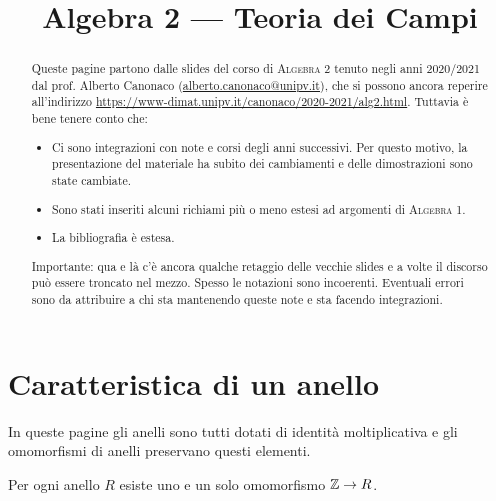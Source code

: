 


\title{Algebra 2 --- Teoria dei Campi}
\author{}
\date{}




\maketitle

\begin{abstract}
Queste pagine partono dalle \textenglish{slides} del corso di {\scshape Algebra 2} tenuto negli anni 2020/2021 dal prof. Alberto Canonaco (\url{alberto.canonaco@unipv.it}), che si possono ancora reperire all'indirizzo \url{https://www-dimat.unipv.it/canonaco/2020-2021/alg2.html}. Tuttavia è bene tenere conto che:
\begin{itemize}[leftmargin=*]
\item Ci sono integrazioni con note e corsi degli anni successivi. Per questo motivo, la presentazione del materiale ha subito dei cambiamenti e delle dimostrazioni sono state cambiate.
\item Sono stati inseriti alcuni richiami più o meno estesi ad argomenti di {\scshape Algebra 1}.
\item La bibliografia è estesa.
\end{itemize}
Importante: qua e là c'è ancora qualche retaggio delle vecchie slides e a volte il discorso può essere troncato nel mezzo. Spesso le notazioni sono incoerenti. Eventuali errori sono da attribuire a chi sta mantenendo queste note e sta facendo integrazioni.
\end{abstract}

\printbibliography[title=Testi di riferimento]

\clearpage

\tableofcontents

\clearpage


\section{Caratteristica di un anello}

In queste pagine gli anelli sono tutti dotati di identità moltiplicativa e gli omomorfismi di anelli preservano questi elementi. %

\begin{lemm}\label{lemm:AnelloIniziale}
Per ogni anello $R$ esiste uno e un solo omomorfismo $\mathbb{Z} \to R$.
\end{lemm}

